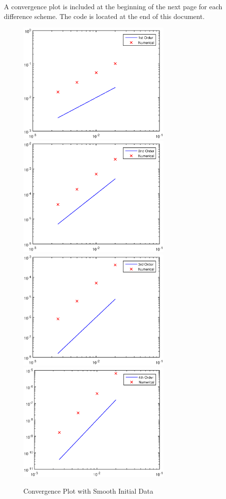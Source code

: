 A convergence plot is included at the beginning of the next page for each difference scheme. The code is located at the end of this document.

\begin{figure}[h]
\centering
\includegraphics[width=3in]{1conv}
\includegraphics[width=3in]{2conv}\\
\includegraphics[width=3in]{3conv}
\includegraphics[width=3in]{4conv}
\caption{Convergence Plot with Smooth Initial Data}
\end{figure}

